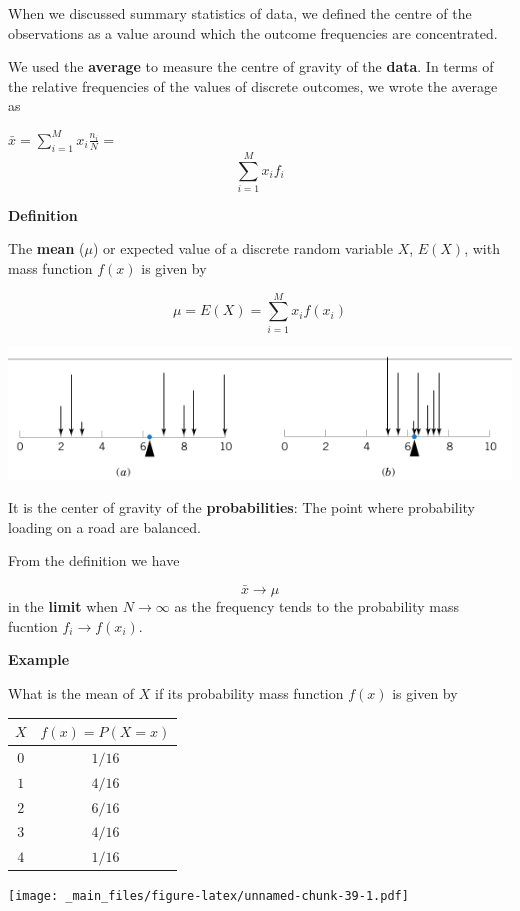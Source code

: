 \documentclass[
]{book}
\begin{document}
When we discussed summary statistics of data, we defined the centre of the observations as a value around which the outcome frequencies are concentrated.

We used the \textbf{average} to measure the centre of gravity of the \textbf{data}. In terms of the relative frequencies of the values of discrete outcomes, we wrote the average as

\(\bar{x}= \sum_{i=1}^M x_i \frac{n_i}{N}=\) \[\sum_{i=1}^M x_i f_i\]

\textbf{Definition}

The \textbf{mean} (\(\mu\)) or expected value of a discrete random variable \(X\), \(E(X)\), with mass function \(f(x)\) is given by

\[ \mu = E(X)= \sum_{i=1}^M x_i f(x_i) \]

\includegraphics{./figures/mu.png}

It is the center of gravity of the \textbf{probabilities}: The point where probability loading on a road are balanced.

From the definition we have

\[\bar{x} \rightarrow \mu\] in the \textbf{limit} when
\(N \rightarrow \infty\) as the frequency tends to the probability mass fucntion \(f_i \rightarrow f(x_i)\).

\textbf{Example}

What is the mean of \(X\) if its probability mass function \(f(x)\) is given by

\begin{longtable}[]{@{}cc@{}}
\toprule\noalign{}
\(X\) & \(f(x)=P(X=x)\) \\
\midrule\noalign{}
\endhead
\bottomrule\noalign{}
\endlastfoot
\(0\) & \(1/16\) \\
\(1\) & \(4/16\) \\
\(2\) & \(6/16\) \\
\(3\) & \(4/16\) \\
\(4\) & \(1/16\) \\
\end{longtable}

\texttt{[image: \_main\_files/figure-latex/unnamed-chunk-39-1.pdf]}
\end{document}
